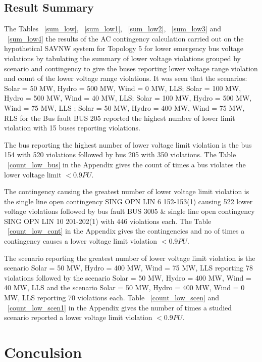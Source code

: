 \documentclass[10pt]{report}
\begin{document}
\section{Result Summary}
The Tables ~\ref{sum_low}, ~\ref{sum_low1}, ~\ref{sum_low2}, ~\ref{sum_low3} and ~\ref{sum_low4}  the results of the AC contingency calculation carried out on the hypothetical SAVNW system for Topology 5 for lower emergency bus voltage violations by tabulating the summary of lower voltage violations grouped by scenario and contingency to give the buses reporting lower voltage range violation and count of the lower voltage range violations. 
It was seen that the scenarios:
Solar = 50 MW, Hydro = 500 MW, Wind = 0 MW, LLS;
Solar = 100 MW, Hydro = 500 MW, Wind = 40 MW, LLS; 
Solar = 100 MW, Hydro = 500 MW, Wind = 75 MW, LLS ;
Solar = 50 MW, Hydro = 400 MW, Wind = 75 MW, RLS for the Bus fault BUS 205 reported the highest number of lower limit violation with 15 buses reporting violations. 

The bus reporting the highest number of lower voltage limit violation is the bus 154 with 520 violations followed by bus 205 with 350 violations. The Table ~\ref{count_low_bus} in the Appendix gives the count of times a bus violates the lower voltage limit $ < 0.9 PU $. 

The contingency causing the greatest number of lower voltage limit violation is the single line open contingency SING OPN LIN 6 152-153(1) causing 522 lower voltage violations followed by bus fault
BUS 3005 \& single line open contingency SING OPN LIN 10 201-202(1) with 446 violations each. The Table ~\ref{count_low_cont} in the Appendix gives the contingencies and no of times a contingency causes a lower voltage limit violation $ < 0.9 PU $.

The scenario reporting the greatest number of lower voltage limit violation is the scenario 
Solar = 50 MW, Hydro = 400 MW, Wind = 75 MW, LLS reporting 78 violations followed by the scenario Solar = 50 MW, Hydro = 400 MW, Wind = 40 MW, LLS and the scenario
Solar = 50 MW, Hydro = 400 MW, Wind = 0 MW, LLS reporting 70 violations each. Table ~\ref{count_low_scen} and ~\ref{count_low_scen1} in the Appendix gives the number of times a studied scenario reported a lower voltage limit violation $ < 0.9 PU $.

\chapter{Conculsion}
\label{conclusion} 
\end{document}
